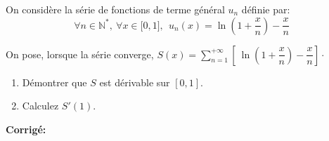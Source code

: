 \documentclass[a4paper,twoside,french,11pt]{VcCours}
\newcommand{\corr}{\textbf{Corrigé:}}
\begin{document}
\medskip
 

\begin{Exercice}{} On consid\`{e}re la série de fonctions de terme général $u_{n}$ définie par: 
\begin{equation*}
\forall n\in \mathbb{N}^{*},\ \forall x\in \lbrack 0,1], \ \ u_{n}\left(x\right) =\ln \left( 1+\dfrac{x}{n}\right) -\dfrac{x}{n}~
\end{equation*}

On pose, lorsque la série converge, $S(x)=\sum\limits_{n=1}^{+\infty }\left[ \ \ln \left( 1+\dfrac{x}{n}\right) -\dfrac{x}{n}\right] \cdot $

\begin{enumerate}
\item Démontrer que $S$ est dérivable sur $[0,1]$.
\item Calculez $S'(1)$.
\end{enumerate}
\end{Exercice}

\corr 
\end{document}
